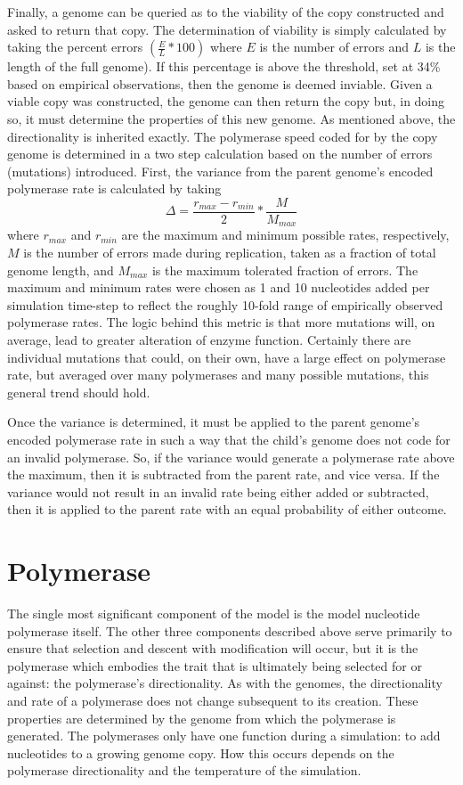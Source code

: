 Finally, a genome can be queried as to the viability of the copy constructed and asked to return that copy. The determination of viability is simply calculated by taking the percent errors $(\frac{E}{L}*100)$ where $E$ is the number of errors and $L$ is the length of the full genome). If this percentage is above the threshold, set at 34\% based on empirical observations, then the genome is deemed inviable. Given a viable copy was constructed, the genome can then return the copy but, in doing so, it must determine the properties of this new genome. As mentioned above, the directionality is inherited exactly. The polymerase speed coded for by the copy genome is determined in a two step calculation based on the number of errors (mutations) introduced. First, the variance from the parent genome's encoded polymerase rate is calculated by taking\[
	\Delta = \frac{r_{max} - r_{min}}{2}*\frac{M}{M_{max}}
\]
where $r_{max}$ and $r_{min}$ are the maximum and minimum possible rates, respectively, $M$ is the number of errors made during replication, taken as a fraction of total genome length, and $M_{max}$ is the maximum tolerated fraction of errors. The maximum and minimum rates were chosen as 1 and 10 nucleotides added per simulation time-step to reflect the roughly 10-fold range of empirically observed polymerase rates. The logic behind this metric is that more mutations will, on average, lead to greater alteration of enzyme function. Certainly there are individual mutations that could, on their own, have a large effect on polymerase rate, but averaged over many polymerases and many possible mutations, this general trend should hold.

Once the variance is determined, it must be applied to the parent genome's encoded polymerase rate in such a way that the child's genome does not code for an invalid polymerase. So, if the variance would generate a polymerase rate above the maximum, then it is subtracted from the parent rate, and vice versa. If the variance would not result in an invalid rate being either added or subtracted, then it is applied to the parent rate with an equal probability of either outcome.

\section*{Polymerase} %
\label{sec:polymerase}
The single most significant component of the model is the model nucleotide polymerase itself. The other three components described above serve primarily to ensure that selection and descent with modification will occur, but it is the polymerase which embodies the trait that is ultimately being selected for or against: the polymerase's directionality. As with the genomes, the directionality and rate of a polymerase does not change subsequent to its creation. These properties are determined by the genome from which the polymerase is generated. The polymerases only have one function during a simulation: to add nucleotides to a growing genome copy. How this occurs depends on the polymerase directionality and the temperature of the simulation.

